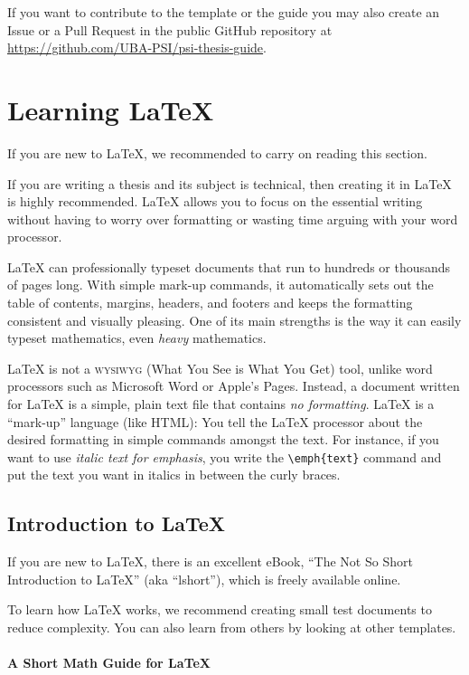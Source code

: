 If you want to contribute to the template or the guide you may also create an Issue or a Pull Request in the public GitHub repository at \url{https://github.com/UBA-PSI/psi-thesis-guide}.

\section{Learning LaTeX}

If you are new to LaTeX, we recommended to carry on reading this section.

If you are writing a thesis and its subject is technical, then creating it in LaTeX is highly recommended. LaTeX allows you to focus on the essential writing without having to worry over formatting or wasting time arguing with your word processor.

LaTeX can professionally typeset documents that run to hundreds or thousands of pages long. With simple mark-up commands, it automatically sets out the table of contents, margins, headers, and footers and keeps the formatting consistent and visually pleasing. One of its main strengths is the way it can easily typeset mathematics, even \emph{heavy} mathematics.

LaTeX is not a \textsc{wysiwyg} (What You See is What You Get) tool, unlike word processors such as Microsoft Word or Apple's Pages. Instead, a document written for LaTeX is a simple, plain text file that contains \emph{no formatting}.
LaTeX is a \enquote{mark-up} language (like HTML): You tell the LaTeX processor about the desired formatting in simple commands amongst the text. For instance, if you want to use \emph{italic text for emphasis}, you write the \verb|\emph{text}| command and put the text you want in italics in between the curly braces.

\subsection{Introduction to LaTeX}

If you are new to LaTeX, there is an excellent eBook, \enquote{The Not So Short Introduction to LaTeX} (aka ``lshort''), which is freely available online.

To learn how LaTeX works, we recommend creating small test documents to reduce complexity. You can also learn from others by looking at other templates.

\paragraph{A Short Math Guide for LaTeX}

